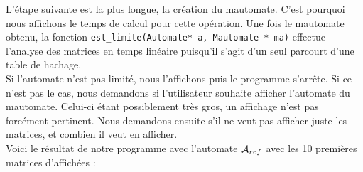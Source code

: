 \documentclass{report}
\begin{document}
L'étape suivante est la plus longue, la création du mautomate. C'est pourquoi nous affichons le temps de calcul pour cette opération. Une fois le mautomate obtenu, la fonction \verb?est_limite(Automate* a, Mautomate * ma)? effectue l'analyse des matrices en temps linéaire puisqu'il s'agit d'un seul parcourt d'une table de hachage.\\
Si l'automate n'est pas limité, nous l'affichons puis le programme s'arrête. Si ce n'est pas le cas, nous demandons si l'utilisateur souhaite afficher l'automate du mautomate. Celui-ci étant possiblement très gros, un affichage n'est pas forcément pertinent. Nous demandons ensuite s'il ne veut pas afficher juste les matrices, et combien il veut en afficher.\\

Voici le résultat de notre programme avec l'automate $\mathcal{A}_{ref}$ avec les 10 premières matrices d'affichées :




\end{document}
